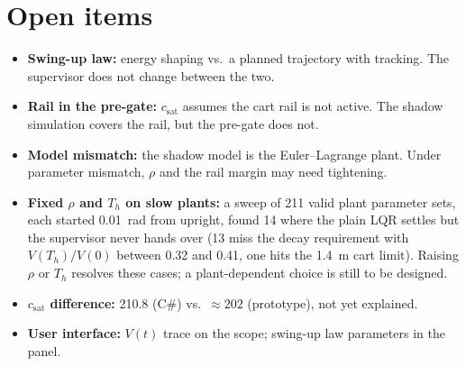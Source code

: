 \documentclass[11pt,a4paper]{article}
\newcommand{\csat}{c_{\mathrm{sat}}}
\begin{document}
\section*{Open items}
\begin{itemize}
\item \textbf{Swing-up law:} energy shaping vs.\ a planned trajectory with tracking. The
supervisor does not change between the two.
\item \textbf{Rail in the pre-gate:} $\csat$ assumes the cart rail is not active. The shadow
simulation covers the rail, but the pre-gate does not.
\item \textbf{Model mismatch:} the shadow model is the Euler--Lagrange plant. Under parameter
mismatch, $\rho$ and the rail margin may need tightening.
\item \textbf{Fixed $\rho$ and $T_h$ on slow plants:} a sweep of 211 valid plant parameter sets,
each started 0.01~rad from upright, found 14 where the plain LQR settles but the supervisor never
hands over (13 miss the decay requirement with $V(T_h)/V(0)$ between 0.32 and 0.41, one hits
the 1.4~m cart limit). Raising $\rho$ or $T_h$ resolves these cases; a plant-dependent choice
is still to be designed.
\item \textbf{$\csat$ difference:} 210.8 (C\#) vs.\ $\approx 202$ (prototype), not yet explained.
\item \textbf{User interface:} $V(t)$ trace on the scope; swing-up law parameters in the panel.
\end{itemize}
\end{document}
